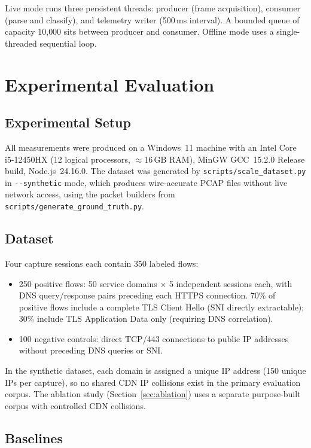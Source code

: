 \documentclass[conference]{IEEEtran}
\begin{document}
Live mode runs three persistent threads: producer (frame acquisition),
consumer (parse and classify), and telemetry writer (500\,ms interval).
A bounded queue of capacity 10{,}000 sits between producer and consumer.
Offline mode uses a single-threaded sequential loop.

\section{Experimental Evaluation}
\label{sec:evaluation}

\subsection{Experimental Setup}

All measurements were produced on a Windows~11 machine with an Intel
Core i5-12450HX (12 logical processors, $\approx$16\,GB RAM),
MinGW GCC~15.2.0 Release build, Node.js~24.16.0.
The dataset was generated by \texttt{scripts/scale\_dataset.py}
in \texttt{-{}-synthetic} mode, which produces wire-accurate PCAP files
without live network access, using the packet builders from
\texttt{scripts/generate\_ground\_truth.py}.

\subsection{Dataset}

Four capture sessions each contain 350 labeled flows:
\begin{itemize}
\item 250 positive flows: 50 service domains $\times$ 5 independent
sessions each, with DNS query/response pairs preceding each HTTPS
connection.  70\% of positive flows include a complete TLS Client
Hello (SNI directly extractable); 30\% include TLS Application Data
only (requiring DNS correlation).
\item 100 negative controls: direct TCP/443 connections to public IP
addresses without preceding DNS queries or SNI.
\end{itemize}

In the synthetic dataset, each domain is assigned a unique IP address
(150 unique IPs per capture), so no shared CDN IP collisions exist
in the primary evaluation corpus.
The ablation study (Section~\ref{sec:ablation}) uses a separate
purpose-built corpus with controlled CDN collisions.

\subsection{Baselines}
\end{document}
